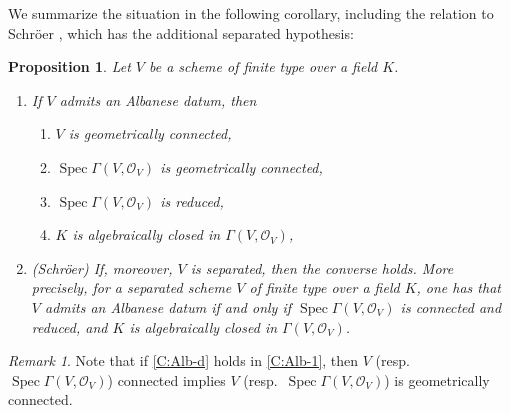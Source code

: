 \documentclass[11pt, reqno]{amsart}
\numberwithin{equation}{section}
\newtheorem{pro}[teo]{Proposition}
\theoremstyle{definition}
\theoremstyle{remark}
\newtheorem{rem}[teo]{Remark}
\begin{document}
We summarize the situation in the following corollary, including the relation to Schr\"oer \cite[Thm.~p.2]{schroeralbanese}, which has the additional separated hypothesis:
  \begin{pro}\label{C:Alb-nEx}
Let $V$ be a scheme of finite type over a field $K$.  
\begin{enumerate}[label={(\roman*)}]

\item 
If $V$ admits an Albanese datum, then \label{C:Alb-1}
\begin{enumerate}[label={(\alph*)}]
\item $V$ is geometrically connected, \label{C:Alb-a}
\item $\operatorname{Spec}\Gamma(V,\mathcal O_V)$ is geometrically connected,\label{C:Alb-b}
\item $\operatorname{Spec}\Gamma(V,\mathcal O_V)$ is reduced, \label{C:Alb-c}
\item $K$ is algebraically closed in $\Gamma(V,\mathcal O_V)$, \label{C:Alb-d} 
\end{enumerate}
\item (Schr\"oer) If, moreover, $V$ is separated, then the converse holds. More precisely, for a separated scheme $V$ of finite type over a field $K$, one has that  $V$ admits an Albanese  datum if and only if $\operatorname{Spec}\Gamma(V,\mathcal O_V)$ is connected and reduced, and $K$ is algebraically closed in $\Gamma(V,\mathcal O_V)$.  \label{C:Alb-2}
\end{enumerate}
\end{pro}


\begin{rem}
Note that if 
  \ref{C:Alb-d} holds in \ref{C:Alb-1}, then $V$ (resp.~$\operatorname{Spec}\Gamma(V,\mathcal O_V)$) connected implies $V$ (resp.~$\operatorname{Spec}\Gamma(V,\mathcal O_V)$) is geometrically connected. 
\end{rem}
\end{document}
